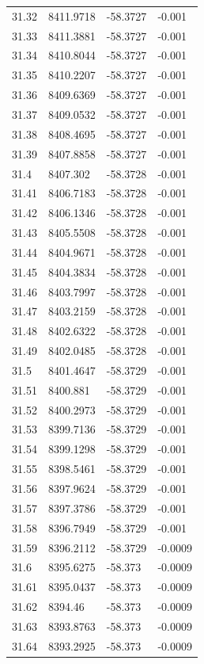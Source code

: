 \begin{table}[H]
\begin{tabular}{llll}
31.32 & 8411.9718 & -58.3727 & -0.001 \\
31.33 & 8411.3881 & -58.3727 & -0.001 \\
31.34 & 8410.8044 & -58.3727 & -0.001 \\
31.35 & 8410.2207 & -58.3727 & -0.001 \\
31.36 & 8409.6369 & -58.3727 & -0.001 \\
31.37 & 8409.0532 & -58.3727 & -0.001 \\
31.38 & 8408.4695 & -58.3727 & -0.001 \\
31.39 & 8407.8858 & -58.3727 & -0.001 \\
31.4 & 8407.302 & -58.3728 & -0.001 \\
31.41 & 8406.7183 & -58.3728 & -0.001 \\
31.42 & 8406.1346 & -58.3728 & -0.001 \\
31.43 & 8405.5508 & -58.3728 & -0.001 \\
31.44 & 8404.9671 & -58.3728 & -0.001 \\
31.45 & 8404.3834 & -58.3728 & -0.001 \\
31.46 & 8403.7997 & -58.3728 & -0.001 \\
31.47 & 8403.2159 & -58.3728 & -0.001 \\
31.48 & 8402.6322 & -58.3728 & -0.001 \\
31.49 & 8402.0485 & -58.3728 & -0.001 \\
31.5 & 8401.4647 & -58.3729 & -0.001 \\
31.51 & 8400.881 & -58.3729 & -0.001 \\
31.52 & 8400.2973 & -58.3729 & -0.001 \\
31.53 & 8399.7136 & -58.3729 & -0.001 \\
31.54 & 8399.1298 & -58.3729 & -0.001 \\
31.55 & 8398.5461 & -58.3729 & -0.001 \\
31.56 & 8397.9624 & -58.3729 & -0.001 \\
31.57 & 8397.3786 & -58.3729 & -0.001 \\
31.58 & 8396.7949 & -58.3729 & -0.001 \\
31.59 & 8396.2112 & -58.3729 & -0.0009 \\
31.6 & 8395.6275 & -58.373 & -0.0009 \\
31.61 & 8395.0437 & -58.373 & -0.0009 \\
31.62 & 8394.46 & -58.373 & -0.0009 \\
31.63 & 8393.8763 & -58.373 & -0.0009 \\
31.64 & 8393.2925 & -58.373 & -0.0009 \\

\end{tabular}
\end{table}
